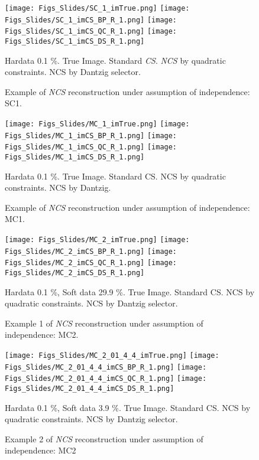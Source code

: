 		\begin{figure}[H]
			\centering
			\texttt{[image: Figs\_Slides/SC\_1\_imTrue.png]}
			\texttt{[image: Figs\_Slides/SC\_1\_imCS\_BP\_R\_1.png]}
			\texttt{[image: Figs\_Slides/SC\_1\_imCS\_QC\_R\_1.png]}
			\texttt{[image: Figs\_Slides/SC\_1\_imCS\_DS\_R\_1.png]}			
		\caption[Example of \emph{NCS} reconstruction under independence: SC1]{Example of \emph{NCS} reconstruction under assumption of independence: SC1.}
		\scriptsize{Hardata 0.1 \%. True Image. Standard \emph{CS}. \emph{NCS} by quadratic constraints. NCS by Dantzig selector.}
				\label{fig:Naive2MC1_Performance_1}	
		\end{figure}



		\begin{figure}[H]
			\centering
			\texttt{[image: Figs\_Slides/MC\_1\_imTrue.png]}
			\texttt{[image: Figs\_Slides/MC\_1\_imCS\_BP\_R\_1.png]}
			\texttt{[image: Figs\_Slides/MC\_1\_imCS\_QC\_R\_1.png]}
			\texttt{[image: Figs\_Slides/MC\_1\_imCS\_DS\_R\_1.png]}			
		\caption[Example of \emph{NCS} reconstruction under independence: MC1]{Example of \emph{NCS} reconstruction under assumption of independence: MC1.}
		\scriptsize{Hardata 0.1 \%. True Image. Standard CS. NCS by quadratic constraints. NCS by Dantzig.}
				\label{fig:Naive2MC1_Performance_2}		
		\end{figure}


		\begin{figure}[H]
			\centering
			\texttt{[image: Figs\_Slides/MC\_2\_imTrue.png]}
			\texttt{[image: Figs\_Slides/MC\_2\_imCS\_BP\_R\_1.png]}
			\texttt{[image: Figs\_Slides/MC\_2\_imCS\_QC\_R\_1.png]}
			\texttt{[image: Figs\_Slides/MC\_2\_imCS\_DS\_R\_1.png]}			
		\caption[Example 1 of \emph{NCS} reconstruction under independence: MC2]{Example 1 of \emph{NCS} reconstruction under assumption of independence: MC2.}
		\scriptsize{Hardata 0.1 \%, Soft data 29.9 \%. True Image. Standard CS. NCS by quadratic constraints. NCS by Dantzig selector.}
				\label{fig:Naive2MC1_Performance_3}		
		\end{figure}


		\begin{figure}[H]
			\centering
			\texttt{[image: Figs\_Slides/MC\_2\_01\_4\_4\_imTrue.png]}
			\texttt{[image: Figs\_Slides/MC\_2\_01\_4\_4\_imCS\_BP\_R\_1.png]}
			\texttt{[image: Figs\_Slides/MC\_2\_01\_4\_4\_imCS\_QC\_R\_1.png]}
			\texttt{[image: Figs\_Slides/MC\_2\_01\_4\_4\_imCS\_DS\_R\_1.png]}			
		\caption[Example 2 of \emph{NCS} reconstruction under independence: MC2]{Example 2 of \emph{NCS} reconstruction under assumption of independence:  MC2}
		\scriptsize{Hardata 0.1 \%, Soft data 3.9 \%. True Image. Standard CS. NCS by quadratic constraints. NCS by Dantzig selector.}
				\label{fig:Naive2MC1_Performance_4}		
		\end{figure}



